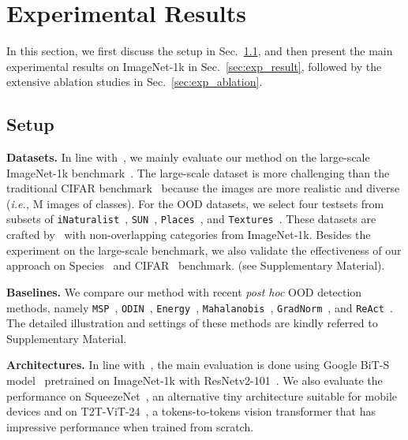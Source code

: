 \section{Experimental Results}

In this section, we first discuss the setup in Sec.~\ref{sec:exp_setup}, and then present the main experimental results on ImageNet-1k in Sec.~\ref{sec:exp_result}, 
followed by the extensive ablation studies in Sec.~\ref{sec:exp_ablation}.

\subsection{Setup}
\label{sec:exp_setup}

\noindent \textbf{Datasets.} In line with~\cite{huang2021mos,sun2021react,huang2021importance}, we mainly evaluate our method on the large-scale ImageNet-1k benchmark~\cite{deng2009imagenet}. The large-scale dataset is more challenging than the traditional CIFAR benchmark~\cite{krizhevsky2009learning} because the images are more realistic and diverse (\emph{i.e.,} M images of  classes). For the OOD datasets, we select four testsets from subsets of \texttt{iNaturalist}~\cite{van2018inaturalist}, \texttt{SUN}~\cite{xiao2010sun}, \texttt{Places}~\cite{zhou2017places}, and \texttt{Textures}~\cite{cimpoi2014describing}. These datasets are crafted by~\cite{huang2021mos} with non-overlapping categories from ImageNet-1k. Besides the experiment on the large-scale benchmark, we also validate the effectiveness of our approach on Species~\cite{hendrycks2019scaling} and CIFAR~\cite{krizhevsky2009learning} benchmark. (see Supplementary Material).



\noindent \textbf{Baselines.}
We compare our method with  recent \emph{post hoc} OOD detection methods, namely \texttt{MSP}~\cite{hendrycks2016baseline}, \texttt{ODIN}~\cite{liang2017enhancing}, \texttt{Energy}~\cite{liu2020energy}, \texttt{Mahalanobis}~\cite{lee2018simple}, \texttt{GradNorm}~\cite{huang2021importance}, and \texttt{ReAct}~\cite{sun2021react}. The detailed illustration and settings of these methods are kindly referred to Supplementary Material.

\noindent \textbf{Architectures.} In line with~\cite{huang2021importance}, the main evaluation is done using Google BiT-S model~\cite{kolesnikov2020big} pretrained on ImageNet-1k with ResNetv2-101~\cite{he2016identity}. We also evaluate the performance on SqueezeNet~\cite{iandola2016squeezenet}, an alternative tiny architecture suitable for mobile devices and on T2T-ViT-24~\cite{yuan2021tokens}, a tokens-to-tokens vision transformer that has impressive performance when trained from scratch. 

